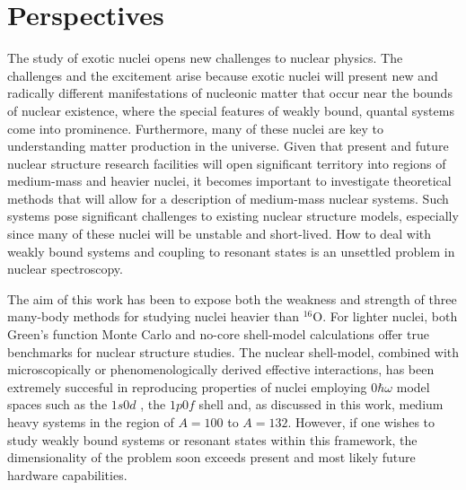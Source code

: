 \documentclass{article}
\begin{document}
\section{Perspectives}\label{sec:sec8}

The study of exotic nuclei opens new 
challenges to nuclear physics. 
The challenges and the excitement arise 
because exotic nuclei will present new and 
radically different manifestations of nucleonic matter 
that occur near the bounds of nuclear existence, 
where the special features of weakly bound, quantal systems 
come into prominence. Furthermore, many of these
nuclei are key to understanding matter production in the universe.
Given that present and future nuclear structure research facilities
will open significant
territory into regions of medium-mass and heavier nuclei,
it becomes important to investigate theoretical methods that will allow
for a description of medium-mass nuclear systems. 
Such systems pose significant
challenges to existing nuclear structure models, especially since many of
these nuclei will be unstable and short-lived. How to deal with weakly
bound systems and coupling to resonant states is an unsettled problem in
nuclear spectroscopy. 

The aim of this work has been to expose both 
the weakness and strength of three many-body 
methods for studying nuclei heavier than $^{16}$O. 
For lighter nuclei, both Green's function 
Monte Carlo \cite{vijay,bob1,bob2,bob3} and no-core shell-model calculations 
\cite{bruce1,bruce2,bruce3,petr_erich2002,petr_erich2003}
offer true benchmarks for nuclear structure studies.
The nuclear shell-model, combined with microscopically or phenomenologically 
derived effective interactions, has been extremely succesful in reproducing 
properties of nuclei 
employing $0\hbar\omega$ model spaces such as the $1s0d$ \cite{alex},
the $1p0f$ shell \cite{taka1,etienne6} and, as discussed in 
this work, medium heavy systems
in the region of $A=100$ to $A=132$. However, 
if one wishes to study weakly bound systems
or resonant states within this framework, the dimensionality 
of the problem soon exceeds
present and most likely future hardware capabilities. 
\end{document}
